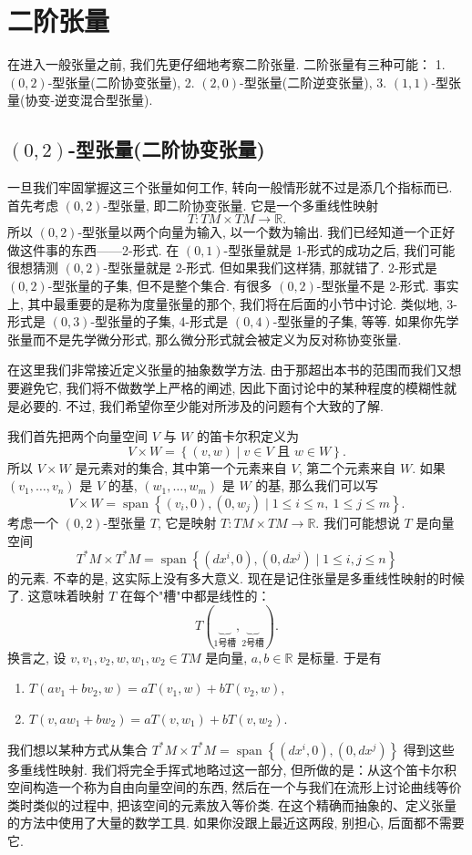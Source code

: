 \section{二阶张量}

在进入一般张量之前, 我们先更仔细地考察二阶张量. 二阶张量有三种可能：
1. $(0,2)$-型张量(二阶协变张量), 
2. $(2,0)$-型张量(二阶逆变张量), 
3. $(1,1)$-型张量(协变-逆变混合型张量).

\subsection{$(0,2)$-型张量(二阶协变张量)}

一旦我们牢固掌握这三个张量如何工作, 转向一般情形就不过是添几个指标而已. 首先考虑 $(0,2)$-型张量, 即二阶协变张量. 它是一个多重线性映射
\[
T:TM\times TM\to\mathbb{R}.
\]
所以 $(0,2)$-型张量以两个向量为输入, 以一个数为输出. 我们已经知道一个正好做这件事的东西——2-形式. 在 $(0,1)$-型张量就是 1-形式的成功之后, 我们可能很想猜测 $(0,2)$-型张量就是 2-形式. 但如果我们这样猜, 那就错了. 2-形式是 $(0,2)$-型张量的子集, 但不是整个集合. 有很多 $(0,2)$-型张量不是 2-形式. 事实上, 其中最重要的是称为度量张量的那个, 我们将在后面的小节中讨论. 类似地, 3-形式是 $(0,3)$-型张量的子集, 4-形式是 $(0,4)$-型张量的子集, 等等. 如果你先学张量而不是先学微分形式, 那么微分形式就会被定义为反对称协变张量.

在这里我们非常接近定义张量的抽象数学方法. 由于那超出本书的范围而我们又想要避免它, 我们将不做数学上严格的阐述, 因此下面讨论中的某种程度的模糊性就是必要的. 不过, 我们希望你至少能对所涉及的问题有个大致的了解.

我们首先把两个向量空间 $V$ 与 $W$ 的笛卡尔积定义为
\[
V\times W=\left\{(v,w)\mid v\in V\text{ 且 }w\in W\right\}.
\]
所以 $V\times W$ 是元素对的集合, 其中第一个元素来自 $V$, 第二个元素来自 $W$. 如果 $(v_1,\ldots,v_n)$ 是 $V$ 的基, $(w_1,\ldots,w_m)$ 是 $W$ 的基, 那么我们可以写
\[
V\times W=\operatorname{span}\left\{(v_i,0),(0,w_j)\mid 1\leq i\leq n,\ 1\leq j\leq m\right\}.
\]
考虑一个 $(0,2)$-型张量 $T$, 它是映射 $T:TM\times TM\to\mathbb{R}$. 我们可能想说 $T$ 是向量空间
\[
T^*M\times T^*M=\operatorname{span}\left\{(dx^i,0),(0,dx^j)\mid 1\leq i,j\leq n\right\}
\]
的元素. 不幸的是, 这实际上没有多大意义. 现在是记住张量是多重线性映射的时候了. 这意味着映射 $T$ 在每个"槽"中都是线性的：
\[
T\left(\underbrace{\quad}_{1\text{号槽}},\underbrace{\quad}_{2\text{号槽}}\right).
\]
换言之, 设 $v,v_1,v_2,w,w_1,w_2\in TM$ 是向量, $a,b\in\mathbb{R}$ 是标量. 于是有
\begin{enumerate}
  \item $T(av_1+bv_2,w)=aT(v_1,w)+bT(v_2,w)$, 
  \item $T(v,aw_1+bw_2)=aT(v,w_1)+bT(v,w_2)$.
\end{enumerate}
我们想以某种方式从集合 $T^*M\times T^*M=\operatorname{span}\left\{(dx^i,0),(0,dx^j)\right\}$ 得到这些多重线性映射. 我们将完全手挥式地略过这一部分, 但所做的是：从这个笛卡尔积空间构造一个称为自由向量空间的东西, 然后在一个与我们在流形上讨论曲线等价类时类似的过程中, 把该空间的元素放入等价类. 在这个精确而抽象的、定义张量的方法中使用了大量的数学工具. 如果你没跟上最近这两段, 别担心, 后面都不需要它.

